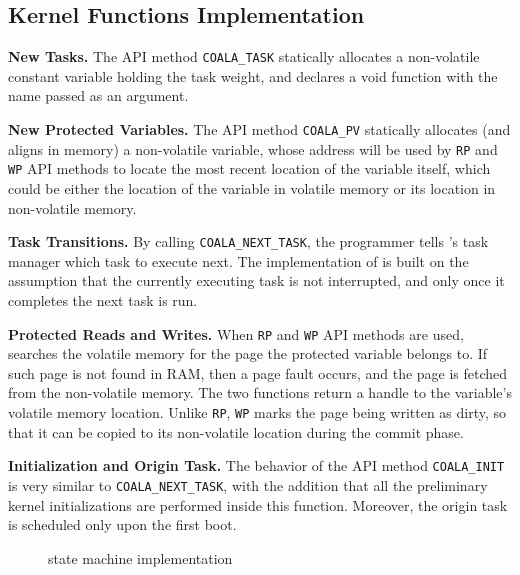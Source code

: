\subsection{\sys Kernel Functions Implementation}

\textbf{New Tasks.} The API method \texttt{COALA\_TASK} statically allocates a non-volatile constant variable holding the task weight, and declares a void function with the name passed as an argument.

\noindent \textbf{New Protected Variables.} The API method \texttt{COALA\_PV} statically allocates (and aligns in memory) a non-volatile variable, whose address will be used by \texttt{RP} and \texttt{WP} API methods to locate the most recent location of the variable itself, which could be either the location of the variable in volatile memory or its location in non-volatile memory.

\noindent \textbf{Task Transitions.} By calling \texttt{COALA\_NEXT\_TASK}, the programmer tells \sys's task manager which task to execute next. The implementation of \sys is built on the assumption that the currently executing task is not interrupted, and only once it completes the next task is run.

\noindent \textbf{Protected Reads and Writes.} When \texttt{RP} and \texttt{WP} API methods are used, \sys searches the volatile memory for the page the protected variable belongs to. If such page is not found in RAM, then a page fault occurs, and the page is fetched from the non-volatile memory. The two functions return a handle to the variable's volatile memory location. Unlike \texttt{RP}, \texttt{WP} marks the page being written as dirty, so that it can be copied to its non-volatile location during the commit phase.

\noindent \textbf{Initialization and Origin Task.} The behavior of the API method \texttt{COALA\_INIT} is very similar to \texttt{COALA\_NEXT\_TASK}, with the addition that all the preliminary kernel initializations are performed inside this function. Moreover, the origin task is scheduled only upon the first boot.

\begin{figure}
	\centering
	\caption{\sys state machine implementation }
	\label{fig:coala_state_machine}
\end{figure}

